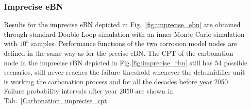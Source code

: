 \subsubsection{Imprecise eBN}
Results for the imprecise eBN depicted in Fig.~\ref{fig:imprecise_ebn} are obtained through standard Double Loop simulation with an inner Monte Carlo simulation with $10^3$ samples. 
Performance functions of the two corrosion model nodes are defined in the same way as for the precise eBN.
The CPT of the carbonation node in the imprecise rBN depicted in Fig.\ref{fig:imprecise_rbn} still has 54 possible scenarios, still never reaches the failure threshold whenever the dehumidifier unit is working the carbonation process and for all the decades before year 2050. Failure probability intervals after year 2050 are shown in Tab.~\ref{Carbonation_imprecise_cpt}.

